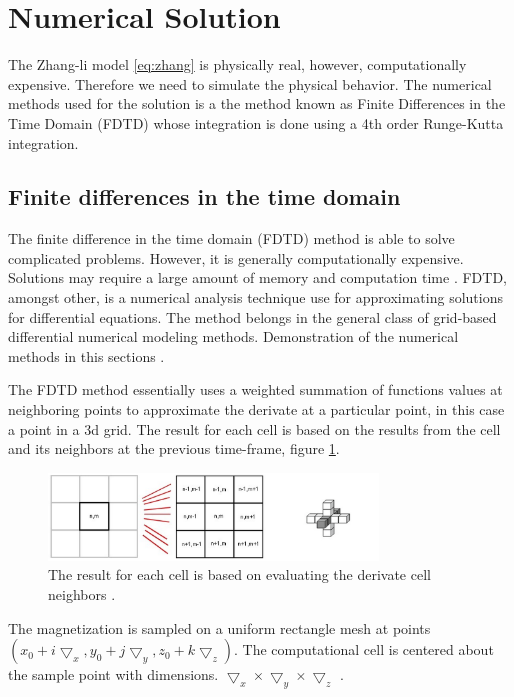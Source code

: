 \section{Numerical Solution}

The Zhang-li model \ref{eq:zhang} is physically real, however, computationally expensive. Therefore we need to simulate the physical behavior. The numerical methods used for the solution is a the method known as Finite Differences in the Time Domain (FDTD) whose integration is done using a 4th order Runge-Kutta integration.

\subsection{Finite differences in the time domain}

The finite difference in the time domain (FDTD) method  is able to solve complicated problems. However, it is generally computationally expensive. Solutions may require a large amount of memory and computation time \cite{ufdtd}. FDTD, amongst other, is a numerical analysis technique use for approximating solutions for differential equations. The method belongs in the general class of grid-based differential numerical modeling methods. Demonstration of the numerical methods in this sections \cite{methods}.

The FDTD method essentially uses a weighted summation of functions values at neighboring points to approximate the derivate at a particular point, in this case a point in a 3d grid. The result for each cell is based on the results from the cell and its neighbors at the previous time-frame, figure \ref{fig:fdtd}.  

\begin{figure}[htbp]
	\centering
		\includegraphics[width=0.78\textwidth]{Figures/fdtd.png}
		\smallskip
	\caption[FDTD grid]{The result for each cell is based on evaluating the derivate cell neighbors \cite{methods}.}
	\label{fig:fdtd}
\end{figure}

The magnetization is sampled on a uniform rectangle mesh at points $(x_0 + i\bigtriangledown_x, y_0 + j\bigtriangledown_y, z_0 + k\bigtriangledown_z)$. The computational cell is centered about the sample point with dimensions. $\bigtriangledown_x \times \bigtriangledown_y \times \bigtriangledown_z$ \cite{methods}.

